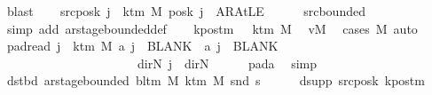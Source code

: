 \begin{isabellebody}
\ blast\isanewline
\ \ \isamarkupfalse%
\ src{\isacharunderscore}{\kern0pt}posk{\isacharcolon}{\kern0pt}\ {\isachardoublequoteopen}{\isasymforall}j\ {\isasymge}\ k{\isacharunderscore}{\kern0pt}tm\ M{\isachardot}{\kern0pt}\ posk\ j\ {\isacharequal}{\kern0pt}\ AR{\isacharunderscore}{\kern0pt}AtLE{\isachardoublequoteclose}\isanewline
\ \ \ \ \isamarkupfalse%
\ src{\isacharunderscore}{\kern0pt}bounded\ \isamarkupfalse%
\ {\isacharparenleft}{\kern0pt}simp\ add{\isacharcolon}{\kern0pt}\ ar{\isacharunderscore}{\kern0pt}stage{\isacharunderscore}{\kern0pt}bounded{\isacharunderscore}{\kern0pt}def{\isacharparenright}{\kern0pt}\isanewline
\ \ \isamarkupfalse%
\ kpos{\isacharunderscore}{\kern0pt}tm{\isacharcolon}{\kern0pt}\ {\isachardoublequoteopen}{}\ {\isacharless}{\kern0pt}\ k{\isacharunderscore}{\kern0pt}tm\ M{\isachardoublequoteclose}\ \isamarkupfalse%
\ vM\ \isamarkupfalse%
\ {\isacharparenleft}{\kern0pt}cases\ M{\isacharparenright}{\kern0pt}\ auto\isanewline
\ \ \isamarkupfalse%
\ pad{\isacharunderscore}{\kern0pt}read{\isacharcolon}{\kern0pt}\ {\isachardoublequoteopen}{\isasymforall}j\ {\isasymge}\ k{\isacharunderscore}{\kern0pt}tm\ M{\isachardot}{\kern0pt}\ {\isacharquery}{\kern0pt}a\ j\ {\isacharequal}{\kern0pt}\ BLANK{}\ {\isasymand}\ {\isacharquery}{\kern0pt}a\ j\ {\isacharequal}{\kern0pt}\ BLANK{}\isanewline
\ \ \ \ \ \ \ \ \ \ \ \ \ \ \ \ \ \ \ \ {\isasymand}\ {\isacharparenleft}{\kern0pt}{\isasymlambda}{\isacharunderscore}{\kern0pt}{\isachardot}{\kern0pt}\ dir{\isachardot}{\kern0pt}N{\isacharparenright}{\kern0pt}\ j\ {\isacharequal}{\kern0pt}\ dir{\isachardot}{\kern0pt}N{\isachardoublequoteclose}\isanewline
\ \ \ \ \isamarkupfalse%
\ pad{\isacharunderscore}{\kern0pt}a\ \isamarkupfalse%
\ simp\isanewline
\ \ \isamarkupfalse%
\ dst{\isacharunderscore}{\kern0pt}bd{\isacharcolon}{\kern0pt}\ {\isachardoublequoteopen}ar{\isacharunderscore}{\kern0pt}stage{\isacharunderscore}{\kern0pt}bounded\ {\isacharparenleft}{\kern0pt}bl{\isacharunderscore}{\kern0pt}tm\ M{\isacharparenright}{\kern0pt}\ {\isacharparenleft}{\kern0pt}k{\isacharunderscore}{\kern0pt}tm\ M{\isacharparenright}{\kern0pt}\ {\isacharparenleft}{\kern0pt}snd\ {\isacharquery}{\kern0pt}s{\isacharprime}{\kern0pt}{\isacharparenright}{\kern0pt}{\isachardoublequoteclose}\isanewline
\ \ \ \ \isamarkupfalse%
\ dsupp\ src{\isacharunderscore}{\kern0pt}posk\ kpos{\isacharunderscore}{\kern0pt}tm\ \isamarkupfalse%

\end{isabellebody}
